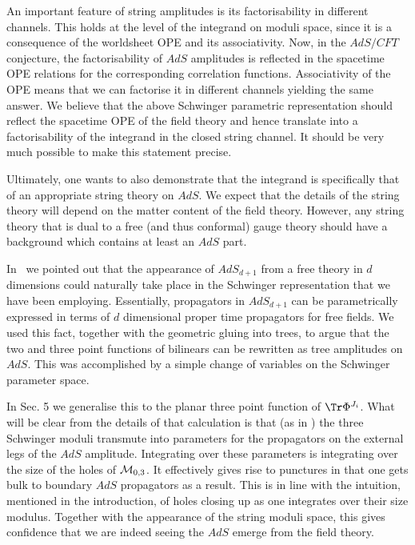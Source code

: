 An important feature of string amplitudes is its factorisability in different
channels. This holds at the level of the integrand on moduli space, since it is 
a consequence of the worldsheet OPE and its associativity. Now, in 
the $AdS/CFT$ conjecture, the factorisability of $AdS$ amplitudes is reflected 
in the spacetime OPE relations for the corresponding correlation functions. 
Associativity of the OPE means 
that we can factorise it in different channels yielding the same answer.  
We believe that the above Schwinger 
parametric representation should reflect the spacetime OPE of the 
field theory and hence translate into a factorisability of the integrand 
in the closed string channel. 
It should be very much possible to make this statement precise. 

Ultimately, one wants to also demonstrate that the integrand is specifically 
that of an appropriate string theory on $AdS$. We expect that the details 
of the string theory will depend on the matter content of the field theory.
However, any string theory that is dual to a free (and thus conformal) 
gauge theory should have a background which contains at least an $AdS$ part.  

In \ff\ we pointed out that the appearance of $AdS_{d+1}$ from a free theory 
in $d$ dimensions could naturally take place in the Schwinger
representation that we have been employing. 
Essentially, propagators in $AdS_{d+1}$ can be parametrically 
expressed in terms of $d$ dimensional proper time propagators 
for free fields. 
We used this fact, together with the 
geometric gluing into trees, to argue that the 
two and three point functions of bilinears can be rewritten as 
tree amplitudes on $AdS$. This was accomplished by a simple change of variables 
on the Schwinger parameter space. 

In Sec. 5 we generalise this to the planar three 
point function of $\Tr\P^{J_i}$. What will be clear from the details of 
that calculation is that (as in \ff ) the three Schwinger 
moduli transmute into parameters for the 
propagators on the external legs of the $AdS$ amplitude. Integrating over these
parameters is integrating over the size of the holes of ${\cal M}_{0,3}$. It 
effectively gives rise to punctures in that one gets bulk to boundary $AdS$ 
propagators as a result. This is in line with the intuition, mentioned 
in the introduction, of holes closing 
up as one integrates over their size modulus. 
Together with the appearance of the string moduli space, this gives confidence 
that we are indeed seeing the $AdS$ emerge from the field theory.

